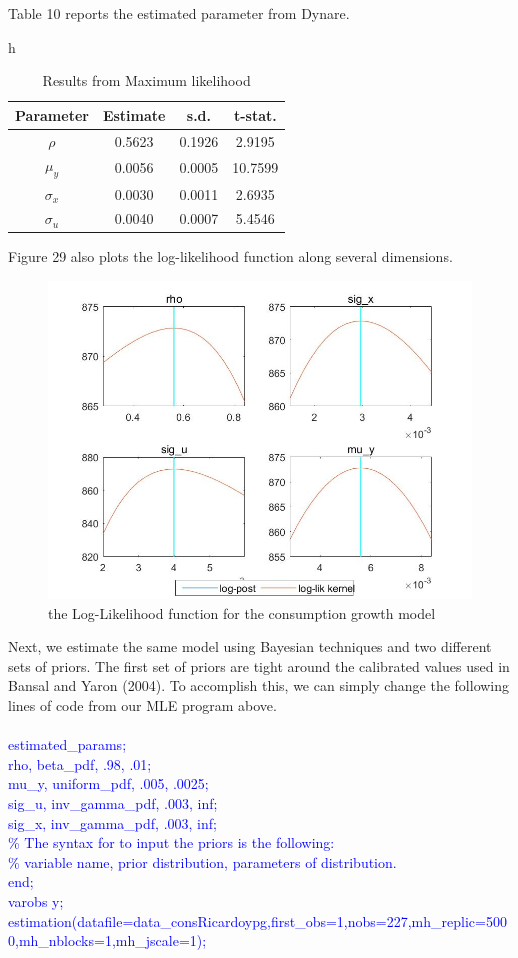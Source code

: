 \documentclass[a4paper,12pt]{scrartcl} %
\begin{document}
Table 10 reports the estimated parameter from Dynare.

\vspace{12cm}

\begin{table}{h}
\centering
\caption{Results from Maximum likelihood}\label{10}
\begin{tabular}{cccc}
\hline
Parameter&Estimate&s.d.&t-stat.\\
\hline
$\rho$&0.5623&0.1926&2.9195\\
$\mu_y$&0.0056&0.0005&10.7599\\
$\sigma_x$&0.0030&0.0011&2.6935\\
$\sigma_u$&0.0040&0.0007&5.4546\\
\hline
\end{tabular}
\end{table}


Figure 29 also plots the log-likelihood function along several dimensions.

\begin{figure}[htbp!]
		\centering
			\includegraphics[width=0.8\linewidth]{fig29.jpg}
            \caption{the Log-Likelihood function for the consumption growth model}\label{29}
\end{figure}

Next, we estimate the same model using Bayesian techniques and two different sets of priors. The first set of priors are tight around the calibrated values used in Bansal and Yaron (2004). To accomplish this, we can simply change the following lines of code from our MLE program above.\\
\\
\textcolor{blue}{
estimated\_params;\\
rho, beta\_pdf, .98, .01;\\
mu\_y, uniform\_pdf, .005, .0025;\\
sig\_u, inv\_gamma\_pdf, .003, inf;\\
sig\_x, inv\_gamma\_pdf, .003, inf;\\
\% The syntax for to input the priors is the following:\\
\% variable name, prior distribution, parameters of distribution.\\
end;\\
varobs y;\\
estimation(datafile=data\_consRicardoypg,first\_obs=1,nobs=227,mh\_replic=5000,mh\_nblocks=1,mh\_jscale=1);}\\
\\
\end{document}
